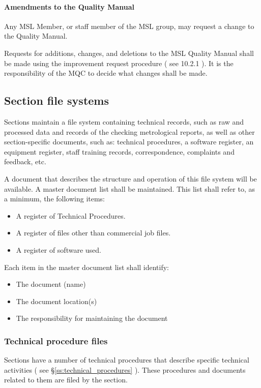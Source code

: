 \paragraph{Amendments to the Quality Manual}
Any MSL Member, or staff member of the MSL group, may request a change to the Quality Manual. 

Requests for additions, changes, and deletions to the MSL Quality Manual shall be made using the improvement request procedure ( see 10.2.1 ).
It is the responsibility of the MQC to decide what changes shall be made.

\subsection{Section file systems}
\label{ss:section_file_systems}
Sections maintain a file system containing technical records, such as raw and processed data and records of the checking metrological reports, as well as other section-specific documents, such as: technical procedures, a software register, an equipment register, staff training records, correspondence, complaints and feedback, etc. 

A document that describes the structure and operation of this file system will be available. A master document list shall be maintained. This list shall refer to, as a minimum, the following items: 
\begin{itemize}
\item A register of Technical Procedures. 
\item A register of files other than commercial job files. 
\item A register of software used. 
\end{itemize}
Each item in the master document list shall identify:
\begin{itemize}
\item The document (name) 
\item The document location(s) 
\item The responsibility for maintaining the document
\end{itemize}

\subsubsection{Technical procedure files}
Sections have a number of technical procedures that describe specific technical activities ( see \S\ref{ss:technical_procedures} ). These procedures and documents related to them are filed by the section.
 
